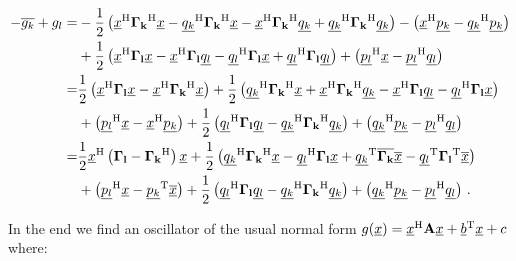 \documentclass[a4paper,10pt]{article}
\begin{document}
\begin{equation}
\begin{split}
 -\conj{g_k} + g_l
 = &
 -\frac{1}{2} \left(
               \vec{x}\H \mat{\Gamma_k}\H \vec{x}
              -\vec{q_k}\H \mat{\Gamma_k}\H \vec{x}
              -\vec{x}\H \mat{\Gamma_k}\H \vec{q_k}
              +\vec{q_k}\H \mat{\Gamma_k}\H \vec{q_k}
              \right)
 - \left(\vec{x}\H \vec{p_k} - \vec{q_k}\H \vec{p_k}\right) \\
 & +
  \frac{1}{2} \left(
                \vec{x}\H \mat{\Gamma_l} \vec{x}
               -\vec{x}\H \mat{\Gamma_l} \vec{q_l}
               -\vec{q_l}\H \mat{\Gamma_l} \vec{x}
               +\vec{q_l}\H \mat{\Gamma_l} \vec{q_l}
              \right)
 + \left(\vec{p_l}\H \vec{x} - \vec{p_l}\H \vec{q_l}\right) \\
 = &
 \frac{1}{2} \left(\vec{x}\H \mat{\Gamma_l} \vec{x} - \vec{x}\H \mat{\Gamma_k}\H \vec{x}\right)
 +
 \frac{1}{2} \left(
               \vec{q_k}\H \mat{\Gamma_k}\H \vec{x}
              +\vec{x}\H \mat{\Gamma_k}\H \vec{q_k}
              -\vec{x}\H \mat{\Gamma_l} \vec{q_l}
              -\vec{q_l}\H \mat{\Gamma_l} \vec{x}
             \right) \\
 & +
 \left(\vec{p_l}\H \vec{x} - \vec{x}\H \vec{p_k}\right)
 + \frac{1}{2} \left(
                 \vec{q_l}\H \mat{\Gamma_l} \vec{q_l}
                -\vec{q_k}\H \mat{\Gamma_k}\H \vec{q_k}
               \right)
 + \left(\vec{q_k}\H \vec{p_k} - \vec{p_l}\H \vec{q_l}\right) \\
 = &
 \frac{1}{2} \vec{x}\H \left(\mat{\Gamma_l} - \mat{\Gamma_k}\H\right) \vec{x}
 + \frac{1}{2} \left(
                 \vec{q_k}\H \mat{\Gamma_k}\H \vec{x}
                -\vec{q_l}\H \mat{\Gamma_l} \vec{x}
                +\vec{q_k}\T \conj{\mat{\Gamma_k}} \conj{\vec{x}}
                -\vec{q_l}\T \mat{\Gamma_l}\T \conj{\vec{x}}
               \right) \\
 & +
 \left(\vec{p_l}\H \vec{x} - \vec{p_k}\T \conj{\vec{x}}\right)
 + \frac{1}{2} \left(
                 \vec{q_l}\H \mat{\Gamma_l} \vec{q_l}
                -\vec{q_k}\H \mat{\Gamma_k}\H \vec{q_k}
               \right)
 + \left(\vec{q_k}\H \vec{p_k} - \vec{p_l}\H \vec{q_l}\right) \,.
\end{split}
\end{equation}

In the end we find an oscillator of the usual normal form
$g(\vec{x}) = \vec{x}\H \mat{A} \vec{x} + \vec{b}\T \vec{x} + c$
where:
\end{document}
